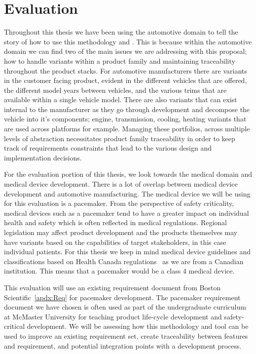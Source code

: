 \chapter{Evaluation}

Throughout this thesis we have been using the automotive domain to tell the story of how to use this methodology and \tool. This is because within the automotive domain we can find two of the main issues we are addressing with this proposal; how to handle variants within a product family and maintaining traceability throughout the product stacks. For automotive manufacturers there are variants in the customer facing product, evident in the different vehicles that are offered, the different model years between vehicles, and the various trims that are available within a single vehicle model. There are also variants that can exist internal to the manufacturer as they go through development and decompose the vehicle into it's components; engine, transmission, cooling, heating variants that are used across platforms for example. Managing these portfolios, across multiple levels of abstraction necessitates product family traceability in order to keep track of requirements constraints that lead to the various design and implementation decisions. 

For the evaluation portion of this thesis, we look towards the medical domain and medical device development. There is a lot of overlap between medical device development and automotive manufacturing. The medical device we will be using for this evaluation is a pacemaker. From the perspective of safety criticality, medical devices such as a pacemaker tend to have a greater impact on individual health and safety which is often reflected in medical regulations. Regional legislation may affect product development and the products themselves may have variants based on the capabilities of target stakeholders, in this case individual patients. For this thesis we keep in mind medical device guidelines and classifications based on Health Canada regulations~\cite{CanadaGuidanceDocument, VerifyDevices} as we are from a Canadian institution. This means that a pacemaker would be a class 4 medical device.

This evaluation will use an existing requirement document from Boston Scientific~\ref{apdx:Req} for pacemaker development. The pacemaker requirement document we have chosen is often used as part of the undergraduate curriculum at McMaster University for teaching product life-cycle development and safety-critical development. We will be assessing how this methodology and tool can be used to improve an existing requirement set, create traceability between features and requirement, and potential integration points with a development process. 

